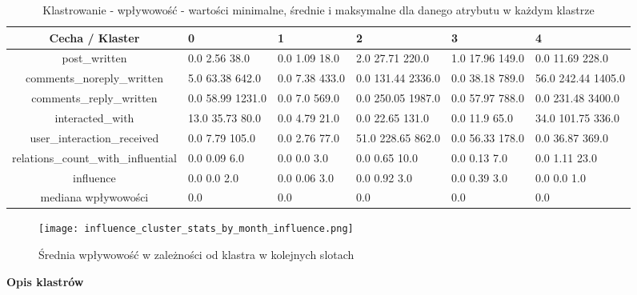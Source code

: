 \documentclass[polish,12pt]{aghthesis}
\begin{document}
\begin{table}[ht]
    \centering
  \begin{center}
\begin{tabular}{ |c|M{1,1cm}|M{1,1cm}|M{1,1cm}|M{1,1cm}|M{1,1cm}| } 
\hline
 Cecha / Klaster & 0 & 1 & 2 & 3 & 4 \\ [0.5ex] 
 \hline
post\_written & 0.0 2.56 38.0 & 0.0 1.09 18.0 & 2.0 27.71 220.0 & 1.0 17.96 149.0 & 0.0 11.69 228.0 \\ 
\hline
comments\_noreply\_written & 5.0 63.38 642.0 & 0.0 7.38 433.0 & 0.0 131.44 2336.0 & 0.0 38.18 789.0 & 56.0 242.44 1405.0 \\ 
\hline
comments\_reply\_written & 0.0 58.99 1231.0 & 0.0 7.0 569.0 & 0.0 250.05 1987.0 & 0.0 57.97 788.0 & 0.0 231.48 3400.0 \\ 
\hline
interacted\_with & 13.0 35.73 80.0 & 0.0 4.79 21.0 & 0.0 22.65 131.0 & 0.0 11.9 65.0 & 34.0 101.75 336.0 \\ 
\hline
user\_interaction\_received & 0.0 7.79 105.0 & 0.0 2.76 77.0 & 51.0 228.65 862.0 & 0.0 56.33 178.0 & 0.0 36.87 369.0 \\ 
\hline
relations\_count\_with\_influential & 0.0 0.09 6.0 & 0.0 0.0 3.0 & 0.0 0.65 10.0 & 0.0 0.13 7.0 & 0.0 1.11 23.0 \\ 
\hline
\hline
influence & 0.0 0.0 2.0 & 0.0 0.06 3.0 & 0.0 0.92 3.0 & 0.0 0.39 3.0 & 0.0 0.0 1.0 \\
\hline
mediana wpływowości & 0.0 & 0.0 & 0.0 & 0.0 & 0.0 \\
\hline
\end{tabular}
\end{center}
\caption{Klastrowanie - wpływowość - wartości minimalne, średnie i maksymalne dla danego atrybutu w każdym klastrze}
\label{tab:i}
\end{table}


\begin{figure}[ht]
    \centering
    \texttt{[image: influence\_cluster\_stats\_by\_month\_influence.png]}
    \caption[Średnia wpływowość w zależności od klastra]{Średnia wpływowość w zależności od klastra w kolejnych slotach}
    \label{fig:influence_cluster_stats}
\end{figure}

\FloatBarrier



    

\textbf{Opis klastrów}
\end{document}
